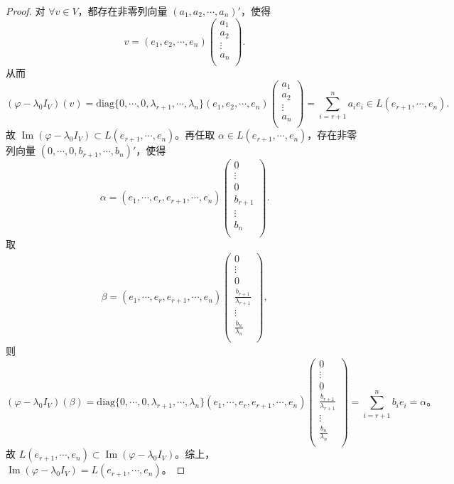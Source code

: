 \documentclass[../../main.tex]{subfiles}%
\begin{document}
\begin{proof}
对 \(\forall v \in V\)，都存在非零列向量 \((a_1, a_2, \cdots, a_n)'\)，使得
\[
v=(e_1,e_2,\cdots ,e_n)\left( \begin{array}{c}
a_1\\
a_2\\
\vdots\\
a_n\\
\end{array} \right) .
\]
从而
\[
(\varphi -\lambda _0I_V)(v)=\mathrm{diag}\{0,\cdots ,0,\lambda _{r+1},\cdots ,\lambda _n\}(e_1,e_2,\cdots ,e_n)\left( \begin{array}{c}
a_1\\
a_2\\
\vdots\\
a_n\\
\end{array} \right) =\sum_{i=r+1}^n{a_ie_i}\in L(e_{r+1},\cdots ,e_n).
\]
故 \(\operatorname{Im}(\varphi - \lambda_0 I_V) \subset L(e_{r+1}, \cdots, e_n)\)。再任取 \(\alpha \in L(e_{r+1}, \cdots, e_n)\)，存在非零列向量 \((0, \cdots, 0, b_{r+1}, \cdots, b_n)'\)，使得
\[
\alpha =(e_1,\cdots ,e_r,e_{r+1},\cdots ,e_n)\left( \begin{array}{c}
0\\
\vdots\\
0\\
b_{r+1}\\
\vdots\\
b_n\\
\end{array} \right) .
\]
取
\begin{align*}
\beta =(e_1,\cdots ,e_r,e_{r+1},\cdots ,e_n)\left( \begin{array}{c}
0\\
\vdots\\
0\\
\frac{b_{r+1}}{\lambda _{r+1}}\\
\vdots\\
\frac{b_n}{\lambda _n}\\
\end{array} \right) ,
\end{align*}
则
\[
(\varphi -\lambda _0I_V)(\beta )=\mathrm{diag}\{0,\cdots ,0,\lambda _{r+1},\cdots ,\lambda _n\}(e_1,\cdots ,e_r,e_{r+1},\cdots ,e_n)\left( \begin{array}{c}
0\\
\vdots\\
0\\
\frac{b_{r+1}}{\lambda _{r+1}}\\
\vdots\\
\frac{b_n}{\lambda _n}\\
\end{array} \right) =\sum_{i=r+1}^n{b_ie_i}=\alpha \text{。}
\]
故 \(L(e_{r+1}, \cdots, e_n) \subset \operatorname{Im}(\varphi - \lambda_0 I_V)\)。综上，\(\operatorname{Im}(\varphi - \lambda_0 I_V) = L(e_{r+1}, \cdots, e_n)\)。


\end{proof}
\end{document}
